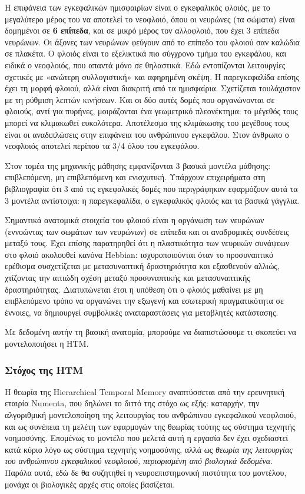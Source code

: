   Η επιφάνεια των εγκεφαλικών ημισφαιρίων είναι ο εγκεφαλικός φλοιός, με το μεγαλύτερο μέρος του να αποτελεί το νεοφλοιό,
  όπου οι νευρώνες (τα σώματα) είναι δομημένοι σε \textbf{6 επίπεδα}, και σε μικρό μέρος τον αλλοφλοιό, που έχει 3 επίπεδα νευρώνων.
  Οι άξονες των νευρώνων φεύγουν από το επίπεδο του φλοιού σαν καλώδια σε πλακέτα.
  Ο φλοιός είναι το εξελικτικά πιο σύγχρονο τμήμα του εγκεφάλου, και ειδικά ο νεοφλοιός, που απαντά μόνο σε θηλαστικά.
  Εδώ εντοπίζονται λειτουργίες σχετικές με «ανώτερη συλλογιστική» και αφηρημένη σκέψη.
  Η παρεγκεφαλίδα επίσης έχει τη μορφή φλοιού, αλλά είναι διακριτή από τα ημισφαίρια. Σχετίζεται τουλάχιστον με τη
  ρύθμιση λεπτών κινήσεων. Και οι δύο αυτές δομές που οργανώνονται σε φλοιούς, αντί για πυρήνες, μοιράζονται ένα
  γεωμετρικό πλεονέκτημα: το μέγεθός τους μπορεί να κλιμακωθεί ευκολότερα.
  Αποτέλεσμα της κλιμάκωσης του μεγέθους τους είναι οι αναδιπλώσεις στην επιφάνεια του ανθρώπινου εγκεφάλου.
  Στον άνθρωπο ο νεοφλοιός αποτελεί περίπου τα 3/4 όλου του εγκεφάλου.

  Στον τομέα της μηχανικής μάθησης εμφανίζονται 3 βασικά μοντέλα μάθησης: επιβλεπόμενη, μη επιβλεπόμενη και ενισχυτική.
  Υπάρχουν επιχειρήματα στη βιβλιογραφία \parencite{doyaWhatAreComputations1999} ότι 3 από τις εγκεφαλικές δομές που περιγράφηκαν εφαρμόζουν
  αυτά τα 3 μοντέλα αντίστοιχα: η παρεγκεφαλίδα, ο εγκεφαλικός φλοιός και τα βασικά γάγγλια.

  Σημαντικά ανατομικά στοιχεία του φλοιού είναι η οργάνωση των νευρώνων (εννοώντας των σωμάτων των νευρώνων) σε επίπεδα και οι αναδρομικές συνδέσεις μεταξύ τους.
  Έχει επίσης παρατηρηθεί ότι η πλαστικότητα των νευρικών συνάψεων στο φλοιό ακολουθεί κανόνα Hebbian:
  ισχυροποιούνται όταν το προσυναπτικό ερέθισμα συσχετίζεται με μετασυναπτική δραστηριότητα και εξασθενούν αλλιώς,
  χτίζοντας την αιτιώδη σχέση μεταξύ προσυναπτικής και μετασυναπτικής δραστηριότητας.
  Διατυπώνεται έτσι η υπόθεση ότι ο φλοιός μαθαίνει με μη επιβλεπόμενο τρόπο να οργανώνει την εξωγενή και εσωτερική πραγματικότητα σε έννοιες,
  να δημιουργεί συμβολικές αναπαραστάσεις για μεταβλητές κατάστασης.

  Με δεδομένη αυτήν τη βασική ανατομία, μπορούμε να διαπιστώσουμε τι σκοπεύει να μοντελοποιήσει η HTM.

\subsubsection{Στόχος της HTM}

  Η θεωρία της Hierarchical Temporal Memory αναπτύσσεται από την ερευνητική εταιρία Numenta, που δηλώνει το διττό της στόχο ως εξής:
  καταρχήν, την αλγοριθμική μοντελοποίηση της λειτουργίας του ανθρώπινου εγκεφαλικού νεοφλοιού,
  και ως συνέπεια τη μελέτη των εφαρμογών της θεωρίας τούτης ως σύστημα τεχνητής νοημοσύνης.
  Επομένως το μοντέλο που μελετά αυτή η εργασία δεν έχει σχεδιαστεί κατά κύριο λόγο ως σύστημα τεχνητής νοημοσύνης,
  αλλά ως \textit{θεωρία της λειτουργίας του ανθρώπινου εγκεφαλικού νεοφλοιού, περιορισμένη από βιολογικά δεδομένα}.
  Παρόλα αυτά, εδώ δε θα συζητηθεί η νευροεπιστημονική πιστότητα του μοντέλου, μονάχα οι βιολογικές αρχές στις οποίες βασίζεται.

